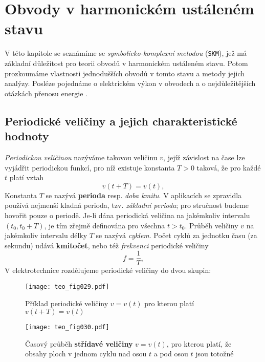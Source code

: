 \chapter{Obvody v harmonickém ustáleném stavu}
  V této kapitole se seznámíme se \emph{symbolicko-komplexní metodou} (\texttt{SKM}), jež má
  základní důležitost pro teorii obvodů v harmonickém ustáleném stavu. Potom prozkoumáme vlastnosti
  jednodušších obvodů v tomto stavu a metody jejich analýzy. Posléze pojednáme o elektrickém výkon
  v obvodech a o nejdůležitějších otázkách přenosu energie \cite[s.~60]{Mayer1978}.
  
  \section{Periodické veličiny a jejich charakteristické hodnoty}
    \emph{Periodickou veličinou} nazýváme takovou veličinu $v$, jejíž závislost na čase lze
    vyjádřit periodickou funkcí, pro níž existuje konstanta $T>0$ taková, že pro každé $t$ platí
    vztah
    \begin{equation}\label{TEO:eq_harm01}
      v(t+T) = v(t),    
    \end{equation}  
    Konstanta $T$ se nazývá \textbf{perioda} resp. \emph{doba kmitu}. V aplikacích se zpravidla
    používá nejmenší kladná perioda, tzv. \emph{základní perioda}; pro stručnost budeme hovořit
    pouze o periodě. Je-li dána periodická veličina na jakémkoliv intervalu $(t_0, t_0+T)$, je tím
    zřejmě definována pro všechna $t>t_0$. Průběh veličiny $v$ na jakémkoliv intervalu délky $T$ se
    nazývá \emph{cyklem}. Počet cyklů za jednotku času (za sekundu) udává \textbf{kmitočet}, nebo
    též \emph{frekvenci} periodické veličiny
    \begin{equation}\label{TEO:eq_harm02}
      f = \frac{1}{T},
    \end{equation}
    V elektrotechnice rozdělujeme periodické veličiny do dvou skupin:
    \begin{figure}[ht!] %
       \centering
       \texttt{[image: teo\_fig029.pdf]}
       \caption{Příklad periodické veličiny $v=v(t)$ pro kterou platí $v(t+T)=v(t)$}
       \label{teo:fig029}
    \end{figure}

    \begin{figure}[ht!] %
       \centering
       \texttt{[image: teo\_fig030.pdf]}
       \caption{Časový průběh \textbf{střídavé veličiny} $v=v(t)$, pro kterou platí, že obsahy ploch
                v jednom cyklu nad osou $t$ a pod osou $t$ jsou totožné}
       \label{teo:fig030}
    \end{figure}

